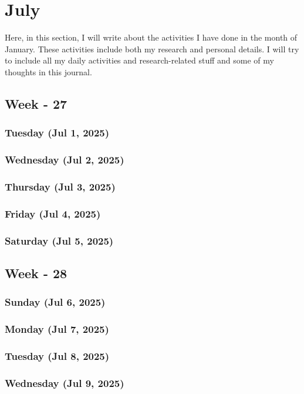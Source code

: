 \chapter{July}
\hspace{1cm}
Here, in this section, I will write about the activities I have done in the month of January\cite{zhou2015}. These activities include both my research and personal details. I will try to include all my daily activities and research-related stuff and some of my thoughts in this journal.

\section{Week - 27}
\subsection*{Tuesday (Jul 1, 2025)}
\subsection*{Wednesday (Jul 2, 2025)}
\subsection*{Thursday (Jul 3, 2025)}
\subsection*{Friday (Jul 4, 2025)}
\subsection*{Saturday (Jul 5, 2025)}

\section{Week - 28}
\subsection*{Sunday (Jul 6, 2025)}
\subsection*{Monday (Jul 7, 2025)}
\subsection*{Tuesday (Jul 8, 2025)}
\subsection*{Wednesday (Jul 9, 2025)}
